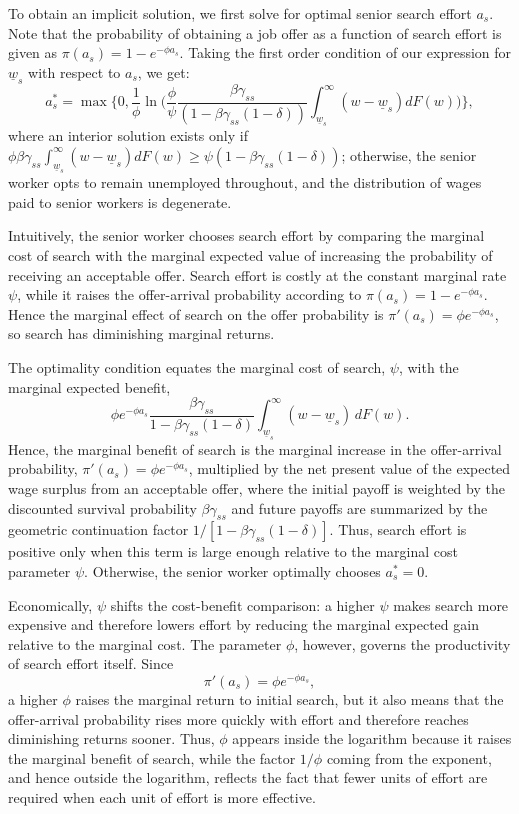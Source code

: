 \documentclass{article}
\newcommand{\lbar}[1]{\underline{#1}} %
\begin{document}
To obtain an implicit solution, we first solve for optimal senior search effort $a_s$. Note that the probability of obtaining a job offer as a function of search effort is given as $\pi(a_s) = 1 - e^{-\phi a_s}$. Taking the first order condition of our expression for $\lbar{w}_s$ with respect to $a_s$, we get:
\[
a_s^*=\max\Biggl\{0,\frac{1}{\phi}\ln\biggl(\frac{\phi}{\psi}\frac{\beta\gamma_{ss}}{(1-\beta\gamma_{ss}(1-\delta))}\int_{\lbar{w}_s}^\infty(w-\lbar{w}_s)dF(w)\biggr)\Biggr\},
\]
where an interior solution exists only if $\phi\beta\gamma_{ss}\int_{\lbar{w}_s}^\infty(w-\lbar{w}_s)dF(w)\geq\psi(1-\beta\gamma_{ss}(1-\delta))$; otherwise, the senior worker opts to remain unemployed throughout, and the distribution of wages paid to senior workers is degenerate.

Intuitively, the senior worker chooses search effort by comparing the marginal cost of search with the marginal expected value of increasing the probability of receiving an acceptable offer. Search effort is costly at the constant marginal rate $\psi$, while it raises the offer-arrival probability according to $\pi(a_s)=1-e^{-\phi a_s}$. Hence the marginal effect of search on the offer probability is $\pi'(a_s)=\phi e^{-\phi a_s}$, so search has diminishing marginal returns.

The optimality condition equates the marginal cost of search, $\psi$, with the marginal expected benefit,
\[
\phi e^{-\phi a_s}
\frac{\beta\gamma_{ss}}
{1-\beta\gamma_{ss}(1-\delta)}
\int_{\lbar{w}_s}^{\infty}(w-\lbar{w}_s)\,dF(w).
\]
Hence, the marginal benefit of search is the marginal increase in the offer-arrival probability, $\pi'(a_s)=\phi e^{-\phi a_s}$, multiplied by the net present value of the expected wage surplus from an acceptable offer, where the initial payoff is weighted by the discounted survival probability $\beta\gamma_{ss}$ and future payoffs are summarized by the geometric continuation factor $1/[1-\beta\gamma_{ss}(1-\delta)]$. Thus, search effort is positive only when this term is large enough relative to the marginal cost parameter $\psi$. Otherwise, the senior worker optimally chooses $a_s^*=0$.

Economically, $\psi$ shifts the cost-benefit comparison: a higher $\psi$ makes search more expensive and therefore lowers effort by reducing the marginal expected gain relative to the marginal cost. The parameter $\phi$, however, governs the productivity of search effort itself. Since
\[
\pi'(a_s)=\phi e^{-\phi a_s},
\]
a higher $\phi$ raises the marginal return to initial search, but it also means that the offer-arrival probability rises more quickly with effort and therefore reaches diminishing returns sooner. Thus, $\phi$ appears inside the logarithm because it raises the marginal benefit of search, while the factor $1/\phi$ coming from the exponent, and hence outside the logarithm, reflects the fact that fewer units of effort are required when each unit of effort is more effective.
\end{document}
